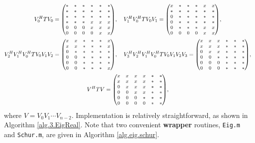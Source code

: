 \begin{gather*}
  V^H_0 T V_0 = {\footnotesize\begin{pmatrix} * & * & * & * & * & * \\ * & * & * & * & * & * \\ * & * & * & * & * & * \\ * & * & * & x & x & x \\ 0 & 0 & 0 & x & x & x \\ 0 & 0 & 0 & 0 & x & x \end{pmatrix}}, \quad 
  V^H_1 V^H_0 T V_0 V_1 = {\footnotesize\begin{pmatrix} x & * & * & * & x & x \\ * & * & * & * & * & * \\ 0 & * & * & * & * & * \\ 0 & * & * & * & * & * \\ 0 & * & * & * & x & x \\ 0 & 0 & 0 & 0 & x & x \end{pmatrix}}, \\
  V^H_2  V^H_1 V^H_0 T V_0  V_1 V_2 = {\footnotesize\begin{pmatrix} x & x & * & * & * & x \\ x & x & * & * & * & x \\ 0 & * & * & * & * & * \\ 0 & 0 & * & * & * & * \\ 0 & 0 & * & * & * & * \\ 0 & 0 & * & * & * & x \end{pmatrix}}, \quad
  V^H_3 V^H_2  V^H_1 V^H_0 T V_0 V_1 V_2 V_3 = {\footnotesize\begin{pmatrix} x & x & x & * & * & * \\ x & x & x & * & * & * \\ 0 & x & x & * & * & * \\ 0 & 0 & * & * & * & * \\ 0 & 0 & 0 & * & * & * \\ 0 & 0 & 0 & * & * & * \end{pmatrix}}, \\
  V^H T V = {\footnotesize\begin{pmatrix} x & x & x & x & * & * \\ x & x & x & x & * & * \\ 0 & x & x & x & * & * \\ 0 & 0 & x & x & * & * \\ 0 & 0 & 0 & * & * & * \\ 0 & 0 & 0 & 0 & * & * \end{pmatrix}},
\end{gather*}
where $V=V_0 V_1 \cdots V_{n-2}$.  Implementation is relatively straightforward, as shown in Algorithm \ref{alg.3.EigReal}.  Note that two convenient {\bf wrapper} routines, {\tt Eig.m} and {\tt Schur.m},
are given in Algorithm \ref{alg.eig.schur}.

